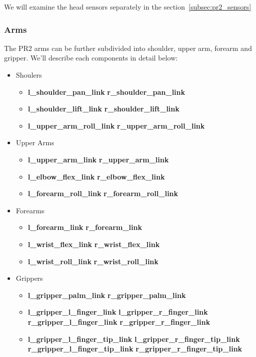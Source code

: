 We will examine the head sensors separately in the section~\ref{subsec:pr2_sensors}

\subsubsection{Arms}
The PR2 arms can be further subdivided into shoulder, upper arm, forearm and gripper.  We'll describe each components in detail below:
\begin{itemize}
\item Shoulers
  \begin{itemize}
  \item {\bf l\_shoulder\_pan\_link} {\bf r\_shoulder\_pan\_link}
  \item {\bf l\_shoulder\_lift\_link} {\bf r\_shoulder\_lift\_link}
  \item {\bf l\_upper\_arm\_roll\_link} {\bf r\_upper\_arm\_roll\_link}
  \end{itemize}
\item Upper Arms
  \begin{itemize}
  \item {\bf l\_upper\_arm\_link} {\bf r\_upper\_arm\_link}
  \item {\bf l\_elbow\_flex\_link} {\bf r\_elbow\_flex\_link}
  \item {\bf l\_forearm\_roll\_link} {\bf r\_forearm\_roll\_link}
  \end{itemize}
\item Forearms
  \begin{itemize}
  \item {\bf l\_forearm\_link} {\bf r\_forearm\_link}
  \item {\bf l\_wrist\_flex\_link} {\bf r\_wrist\_flex\_link}
  \item {\bf l\_wrist\_roll\_link} {\bf r\_wrist\_roll\_link}
  \end{itemize}
\item Grippers
  \begin{itemize}
  \item {\bf l\_gripper\_palm\_link} {\bf r\_gripper\_palm\_link}
  \item {\bf l\_gripper\_l\_finger\_link} {\bf l\_gripper\_r\_finger\_link}
        {\bf r\_gripper\_l\_finger\_link} {\bf r\_gripper\_r\_finger\_link}
  \item {\bf l\_gripper\_l\_finger\_tip\_link} {\bf l\_gripper\_r\_finger\_tip\_link}
        {\bf r\_gripper\_l\_finger\_tip\_link} {\bf r\_gripper\_r\_finger\_tip\_link}
  \end{itemize}
\end{itemize}


